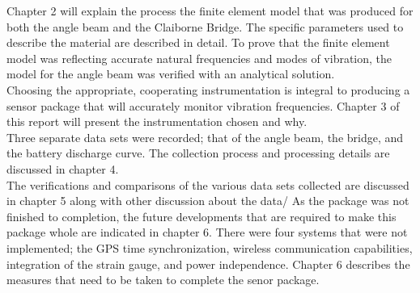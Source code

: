 \indent Chapter 2 will explain the process the finite element model that was produced for both the angle beam and the Claiborne Bridge. The specific
parameters  used to describe the material are described in detail. To prove that the finite element model was reflecting accurate natural frequencies and
modes of vibration, the model for the angle beam was verified with an analytical solution. \\
\indent Choosing the appropriate, cooperating instrumentation is integral to producing a sensor package that will accurately monitor vibration frequencies.
Chapter 3 of this report will present the instrumentation chosen and why. \\
\indent Three separate data sets were recorded; that of the angle beam, the bridge, and the battery discharge curve. The collection process and processing
details are discussed in chapter 4. \\ 
\indent The verifications and comparisons of the various data sets collected are discussed in chapter 5 along with other discussion about the data/ 
\indent As the package was not finished to completion, the future developments that are required to make this package whole are indicated in chapter 6.
There were four systems that were not implemented; the GPS time synchronization, wireless communication capabilities, integration of the strain gauge, and
power independence. Chapter 6 describes the measures that need to be taken to complete the senor package.\\
